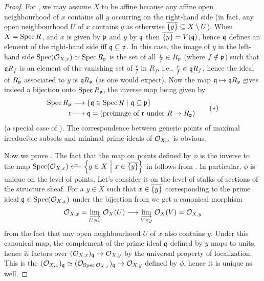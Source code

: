 \documentclass[a4paper,parskip=half,numbers=enddot, DIV=12]{scrreprt}
\begin{document}
\begin{proof}
    For , we may assume $X$ to be affine because any affine open neighbourhood of $x$ contains all $y$ occurring on the right-hand side (in fact, any open neighbourhood $U$ of $x$ contains $y$ as otherwise $\overline{\{y\}}\subseteq X\setminus U$). When $X=\operatorname{Spec} R$, and $x$ is given by $\mathfrak{p}$ and $y$ by $\mathfrak{q}$ then $\overline{\{y\}} = V(\mathfrak{q})$, hence $\mathfrak{q}$ defines an element of the right-hand side iff $\mathfrak{q}\subseteq \mathfrak{p}$. In this case, the image of $y$ in the left-hand side $\operatorname{Spec}(\mathcal{O}_{X,x})\simeq \operatorname{Spec} R_{\mathfrak{p}}$ is the set of all $\frac{r}{f}\in R_{\mathfrak{p}}$ (where $f\notin\mathfrak{p}$) such that $\mathfrak{q} R_f$ is an element of the vanishing set of $\frac{r}{f}$ in $R_f$, i.e., $\frac{r}{f}\in \mathfrak{q} R_f$, hence the ideal of $R_{\mathfrak{p}}$ associated to $y$ is $\mathfrak{q} R_{\mathfrak{p}}$ (as one would expect). Now the map $\mathfrak{q}\mapsto\mathfrak{q} R_{\mathfrak{p}}$ gives indeed a bijection onto $\operatorname{Spec} R_{\mathfrak{p}}$, the inverse map being given by 
    \begin{align}\lbl{eq:localizationBijection}
    	\begin{split}
	    	\Spec R_\pp &\morphism \left\{\qq\in\Spec R\st\qq\subseteq\pp\right\}\\ \rr&\longmapsto \qq= (\text{preimage of }\rr\text{ under }R\to R_\pp)
    	\end{split}\tag{$*$}
    \end{align}
    (a special case of \cite[Corollary~2.3.1]{alg1}). The correspondence between generic points of maximal irreducible subsets and minimal prime ideals of $\mathcal{O}_{X,x}$ is obvious.
    
    Now we prove . The fact that the map on points defined by $\phi$ is the inverse to the map $\Spec(\Oo_{X,x}) \lisomorphism \left\{y\in X\st x\in \ov{\{y\}}\right\}$ in  follows from . In particular, $\phi$ is unique on the level of points. Let's consider it on the level of stalks of sections of the structure sheaf. For a $y\in X$ such that $x\in\overline{\{y\}}$ corresponding to the prime ideal $\mathfrak{q}\in\operatorname{Spec}(\mathcal{O}_{X,x})$ under the bijection from  we get a canonical morphism
    \begin{align*}
        \Oo_{X,x} = \colimit[U\ni x] \Oo_X(U) \morphism \colimit[V\ni y] \Oo_X(V)=\Oo_{X,y}
    \end{align*}
    from the fact that any open neighbourhood $U$ of $x$ also contains $y$. Under this canonical map, the complement of the prime ideal $\mathfrak{q}$ defined by $y$ maps to units, hence it factors over $(\Oo_{X,x})_\qq\morphism \Oo_{X,y}$ by the universal property of localization. This is the $(\Oo_{X,x})_\qq \simeq (\Oo_{\Spec \Oo_{X,x}})_\qq \morphism \Oo_{X,y}$ defined by $\phi$, hence it is unique as well.
\end{proof}
\end{document}
